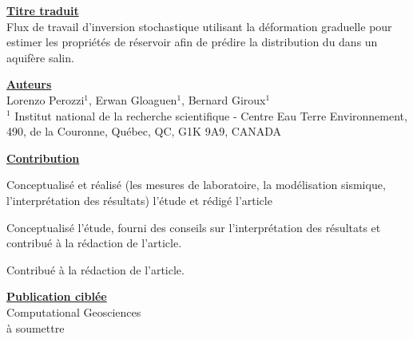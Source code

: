 {\setlength{\parindent}{0cm}
\underline{\textbf{Titre traduit}}\\
Flux de travail d'inversion stochastique utilisant la déformation graduelle
pour estimer les propriétés de réservoir afin de prédire la distribution du
 dans un aquifère salin.

\underline{\textbf{Auteurs}}\\
Lorenzo Perozzi$^1$, Erwan Gloaguen$^1$, Bernard Giroux$^1$\\
$^1$ Institut national de la recherche scientifique - Centre Eau Terre
Environnement, 490, de la Couronne, Qu\'ebec, QC, G1K 9A9, CANADA

\newpage
\underline{\textbf{Contribution}}
{
\begin{description}[leftmargin=!,labelwidth=\widthof{\bfseries Erwan Gloaguen}]
  \setlength\itemsep{0.7em}
  \item[Lorenzo Perozzi] Conceptualisé et réalisé (les mesures de laboratoire,
la modélisation sismique, l’interprétation des résultats) l’étude et rédigé
l’article
  \item[Erwan Gloaguen]  Conceptualisé l'étude, fourni des conseils sur
l’interprétation des résultats et contribué à la rédaction de l’article.
  \item[Bernard Giroux]  Contribué à la rédaction de l’article. \\
\end{description}
}

\underline{\textbf{Publication ciblée}}\\
{
Computational Geosciences\\
à soumettre\\
}

}
